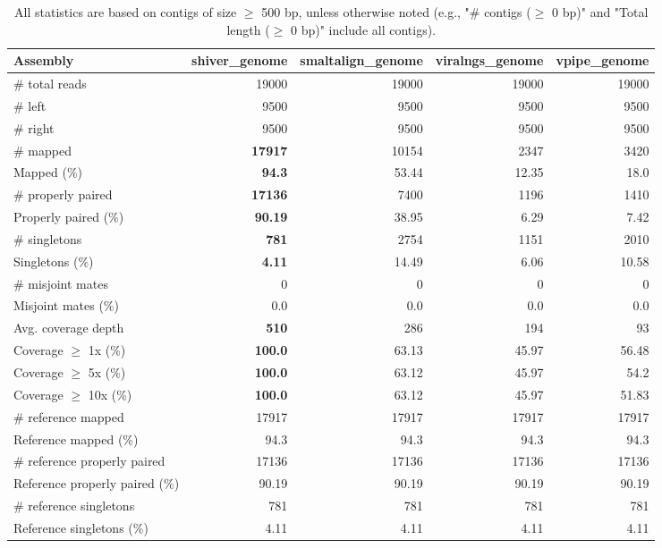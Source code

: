 \documentclass[12pt,a4paper]{article}
\begin{document}
\begin{table}[ht]
\begin{center}
\caption{All statistics are based on contigs of size $\geq$ 500 bp, unless otherwise noted (e.g., "\# contigs ($\geq$ 0 bp)" and "Total length ($\geq$ 0 bp)" include all contigs).}
\begin{tabular}{|l*{4}{|r}|}
\hline
Assembly & shiver\_genome & smaltalign\_genome & viralngs\_genome & vpipe\_genome \\ \hline
\# total reads & 19000 & 19000 & 19000 & 19000 \\ \hline
\# left & 9500 & 9500 & 9500 & 9500 \\ \hline
\# right & 9500 & 9500 & 9500 & 9500 \\ \hline
\# mapped & {\bf 17917} & 10154 & 2347 & 3420 \\ \hline
Mapped (\%) & {\bf 94.3} & 53.44 & 12.35 & 18.0 \\ \hline
\# properly paired & {\bf 17136} & 7400 & 1196 & 1410 \\ \hline
Properly paired (\%) & {\bf 90.19} & 38.95 & 6.29 & 7.42 \\ \hline
\# singletons & {\bf 781} & 2754 & 1151 & 2010 \\ \hline
Singletons (\%) & {\bf 4.11} & 14.49 & 6.06 & 10.58 \\ \hline
\# misjoint mates & 0 & 0 & 0 & 0 \\ \hline
Misjoint mates (\%) & 0.0 & 0.0 & 0.0 & 0.0 \\ \hline
Avg. coverage depth & {\bf 510} & 286 & 194 & 93 \\ \hline
Coverage $\geq$ 1x (\%) & {\bf 100.0} & 63.13 & 45.97 & 56.48 \\ \hline
Coverage $\geq$ 5x (\%) & {\bf 100.0} & 63.12 & 45.97 & 54.2 \\ \hline
Coverage $\geq$ 10x (\%) & {\bf 100.0} & 63.12 & 45.97 & 51.83 \\ \hline
\# reference mapped & 17917 & 17917 & 17917 & 17917 \\ \hline
Reference mapped (\%) & 94.3 & 94.3 & 94.3 & 94.3 \\ \hline
\# reference properly paired & 17136 & 17136 & 17136 & 17136 \\ \hline
Reference properly paired (\%) & 90.19 & 90.19 & 90.19 & 90.19 \\ \hline
\# reference singletons & 781 & 781 & 781 & 781 \\ \hline
Reference singletons (\%) & 4.11 & 4.11 & 4.11 & 4.11 \\ \hline

\end{tabular}
\end{center}
\end{table}
\end{document}

